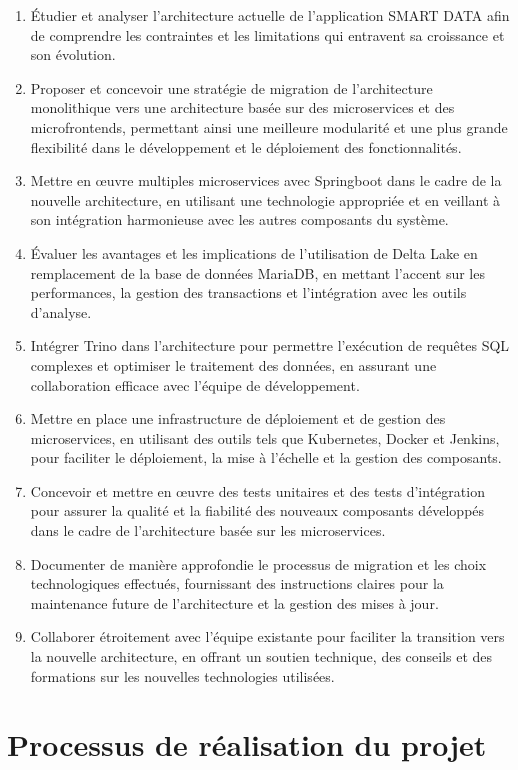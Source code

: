 \begin{enumerate}
    \item Étudier et analyser l'architecture actuelle de l'application SMART DATA afin de comprendre les contraintes et les limitations qui entravent sa croissance et son évolution.
    \item Proposer et concevoir une stratégie de migration de l'architecture monolithique vers une architecture basée sur des microservices et des microfrontends, permettant ainsi une meilleure modularité et une plus grande flexibilité dans le développement et le déploiement des fonctionnalités.
    \item Mettre en œuvre multiples microservices avec Springboot dans le cadre de la nouvelle architecture, en utilisant une technologie appropriée et en veillant à son intégration harmonieuse avec les autres composants du système.
    \item Évaluer les avantages et les implications de l'utilisation de Delta Lake en remplacement de la base de données MariaDB, en mettant l'accent sur les performances, la gestion des transactions et l'intégration avec les outils d'analyse.
    \item Intégrer Trino dans l'architecture pour permettre l'exécution de requêtes SQL complexes et optimiser le traitement des données, en assurant une collaboration efficace avec l'équipe de développement.
    \item Mettre en place une infrastructure de déploiement et de gestion des microservices, en utilisant des outils tels que Kubernetes, Docker et Jenkins, pour faciliter le déploiement, la mise à l'échelle et la gestion des composants.
    \item Concevoir et mettre en œuvre des tests unitaires et des tests d'intégration pour assurer la qualité et la fiabilité des nouveaux composants développés dans le cadre de l'architecture basée sur les microservices.
    \item Documenter de manière approfondie le processus de migration et les choix technologiques effectués, fournissant des instructions claires pour la maintenance future de l'architecture et la gestion des mises à jour.
    \item Collaborer étroitement avec l'équipe existante pour faciliter la transition vers la nouvelle architecture, en offrant un soutien technique, des conseils et des formations sur les nouvelles technologies utilisées.
\end{enumerate}

\section{Processus de réalisation du projet}

